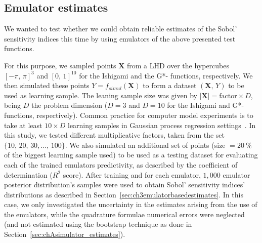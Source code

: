 %
%
%
\clearpage
\subsection{Emulator estimates}\label{sec:chAemulator_estimates}
We wanted to test whether we could obtain reliable estimates of the Sobol' sensitivity indices this time by using emulators of the above presented test functions.

\vspace{0.2cm}
For this purpose, we sampled points $\mathbf{X}$ from a LHD over the hypercubes $[-\pi,\,\pi]^3$ and $[0,\,1]^{10}$ for the Ishigami and the G*- functions, respectively. We then simulated these points $Y=f_{simul}(\mathbf{X})$ to form a dataset $(\mathbf{X},\,Y)$ to be used as learning sample. The leaning sample size was given by $\vert\mathbf{X}\vert=\text{factor}\times D$, being $D$ the problem dimension ($D=3$ and $D=10$ for the Ishigami and G*- functions, respectively). Common practice for computer model experiments is to take at least $10\times D$ learning samples in Gaussian process regression settings~\cite{Rasmussen:2006}. In this study, we tested different multiplicative factors, taken from the set $\{10,\,20,\,30,\dots,\,100\}$. We also simulated an additional set of points (size $=\SI{20}{\percent}$ of the biggest learning sample used) to be used as a testing dataset for evaluating each of the trained emulators predictivity, as described by the coefficient of determination ($R^2$ score). After training and for each emulator, $1,000$ emulator posterior distribution's samples were used to obtain Sobol' sensitivity indices' distributions as described in Section~\ref{sec:ch3emulatorbasedestimates}. In this case, we only investigated the uncertainty in the estimates arising from the use of the emulators, while the quadrature formulae numerical errors were neglected (and not estimated using the bootstrap technique as done in Section~\ref{sec:chAsimulator_estimates}).

